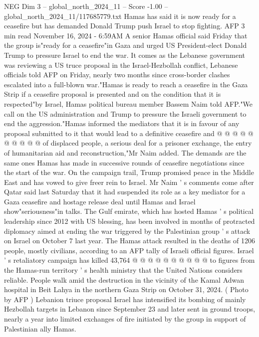 \begin{textsample}{NEG Dim 3 – global\_north\_2024\_11 – Score -1.00 – global\_north\_2024\_11/117685779.txt}  \label{ex:f3_neg_290}
Hamas has said it is now ready for a ceasefire but has demanded Donald Trump push Israel to stop fighting.
AFP 3 min read November 16, 2024 - 6:59AM A senior Hamas official said Friday that the group is"ready for a ceasefire"in Gaza and urged US President-elect Donald Trump to pressure Israel to end the war.
It comes as the Lebanese government was reviewing a US truce proposal in the Israel-Hezbollah conflict, Lebanese officials told AFP on Friday, nearly two months since cross-border clashes escalated into a full-blown war."Hamas is ready to reach a ceasefire in the Gaza Strip if a ceasefire proposal is presented and on the condition that it is respected"by Israel, Hamas political bureau member Bassem Naim told AFP."We call on the US administration and Trump to pressure the Israeli government to end the aggression."Hamas informed the mediators that it is in favour of any proposal submitted to it that would lead to a definitive ceasefire and @ @ @ @ @ @ @ @ @ @ of displaced people, a serious deal for a prisoner exchange, the entry of humanitarian aid and reconstruction,"Mr Naim added.
The demands are the same ones Hamas has made in successive rounds of ceasefire negotiations since the start of the war.
On the campaign trail, Trump promised peace in the Middle East and has vowed to give freer rein to Israel.
Mr Naim ' s comments come after Qatar said last Saturday that it had suspended its role as a key mediator for a Gaza ceasefire and hostage release deal until Hamas and Israel show"seriousness"in talks.
The Gulf emirate, which has hosted Hamas ' s political leadership since 2012 with US blessing, has been involved in months of protracted diplomacy aimed at ending the war triggered by the Palestinian group ' s attack on Israel on October 7 last year.
The Hamas attack resulted in the deaths of 1206 people, mostly civilians, according to an AFP tally of Israeli official figures.
Israel ' s retaliatory campaign has killed 43,764 @ @ @ @ @ @ @ @ @ @ to figures from the Hamas-run territory ' s health ministry that the United Nations considers reliable.
People walk amid the destruction in the vicinity of the Kamal Adwan hospital in Beit Lahya in the northern Gaza Strip on October 31, 2024. ( Photo by AFP ) Lebanion triuce proposal Israel has intensified its bombing of mainly Hezbollah targets in Lebanon since September 23 and later sent in ground troops, nearly a year into limited exchanges of fire initiated by the group in support of Palestinian ally Hamas.

\end{textsample}
